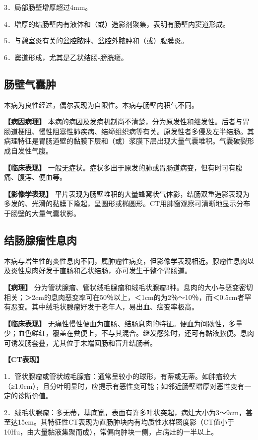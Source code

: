3．局部肠壁增厚超过4mm。

4．增厚的结肠壁内有液体和（或）造影剂聚集，表明有肠壁内窦道形成。

5．与憩室炎有关的盆腔脓肿、盆腔外脓肿和（或）腹膜炎。

6．窦道形成，尤其是乙状结肠-膀胱瘘。

\subsection{肠壁气囊肿}

本病为良性经过，偶尔表现为自限性。本病与肠壁内积气不同。

\textbf{【病因病理】}
本病的病因及发病机制尚不清楚，分为原发性和继发性。后者与胃肠道梗阻、慢性阻塞性肺疾病、结缔组织病等有关。原发性者多侵及左半结肠。其病理特征是胃肠道壁的黏膜下层和（或）浆膜下层出现大量气囊堆积。气囊破裂形成自发性气腹。

\textbf{【临床表现】}
一般无症状。症状多出于原发的肺或胃肠道病变，但有时可有腹痛、腹泻、便血等。

\textbf{【影像学表现】}
平片表现为肠壁堆积的大量蜂窝状气体影，结肠双重造影表现为多发的、光滑的黏膜下隆起，呈圆形或椭圆形。CT用肺窗观察可清晰地显示分布于肠壁的大量气囊状影。

\subsection{结肠腺瘤性息肉}

本病与增生性的炎性息肉不同，属肿瘤性病变，但影像学表现相近。腺瘤性息肉以及炎性息肉好发于直肠和乙状结肠，亦可发生于整个胃肠道。

\textbf{【病理】}
分为管状腺瘤、管状绒毛腺瘤和绒毛状腺瘤3种。息肉的大小与恶变密切相关；＞2cm的息肉恶变率可在50％以上，＜1cm的为2％～10％，而＜0.5cm者罕有恶变。其中绒毛状腺瘤好发于老年人，易出血、癌变率极高。

\textbf{【临床表现】}
无痛性慢性便血为直肠、结肠息肉的特征。便血为间歇性，多量少；血色鲜红，覆盖在粪便上，不与其混合。继发感染时，还可有黏液脓便。息肉可诱发肠套叠，尤其位于末端回肠和盲升结肠者。

\textbf{【CT表现】}

1．管状腺瘤或管状绒毛腺瘤：通常呈较小的球形，有蒂或无蒂。如肿瘤较大（≥1.0cm），且分叶明显时，应提示有恶性变可能；如邻近肠壁增厚对恶性变有一定的诊断价值。

2．绒毛状腺瘤：多无蒂，基底宽，表面有许多叶状突起，病灶大小为3～9cm，甚至达15cm。其特征性CT表现为直肠肿块内有均质性水样密度影（CT值小于10Hu，由大量黏液集聚而成），常偏向肿块一侧，占病灶的一半以上。

